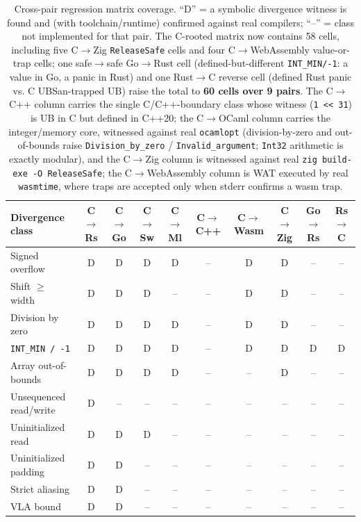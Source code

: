 \documentclass[10pt,a4paper]{article}
\begin{document}
\begin{table}[t]
\centering
\small
\caption{Cross-pair regression matrix coverage. ``D'' = a symbolic divergence
witness is found and (with toolchain/runtime) confirmed against real compilers;
``--'' = class not implemented for that pair. The C-rooted matrix now contains
58 cells, including five C$\to$Zig \texttt{ReleaseSafe} cells and four
C$\to$WebAssembly value-or-trap cells; one safe$\to$safe Go$\to$Rust cell
(defined-but-different \texttt{INT\_MIN/-1}: a value in Go, a panic in Rust) and
one Rust$\to$C reverse cell (defined Rust panic vs. C UBSan-trapped UB) raise the
total to \textbf{60 cells over 9 pairs}. The
C$\to$C++ column carries the single C/C++-boundary class whose witness
(\texttt{1 << 31}) is UB in C but defined in C++20; the C$\to$OCaml column
carries the integer/memory core, witnessed against real \texttt{ocamlopt}
(division-by-zero and out-of-bounds raise \texttt{Division\_by\_zero} /
\texttt{Invalid\_argument}; \texttt{Int32} arithmetic is exactly modular), and
the C$\to$Zig column is witnessed against real \texttt{zig build-exe -O
ReleaseSafe}; the C$\to$WebAssembly column is WAT executed by real
\texttt{wasmtime}, where traps are accepted only when stderr confirms a wasm
trap.}
\label{tab:matrix}
\begin{tabular}{@{}lccccccccc@{}}
\toprule
Divergence class & C$\to$Rs & C$\to$Go & C$\to$Sw & C$\to$Ml & C$\to$C++ & C$\to$Wasm & C$\to$Zig & Go$\to$Rs & Rs$\to$C \\
\midrule
Signed overflow            & D & D & D & D & -- & D & D & -- & -- \\
Shift $\geq$ width          & D & D & D & -- & -- & D & D & -- & -- \\
Division by zero           & D & D & D & D & -- & D & D & -- & -- \\
\texttt{INT\_MIN / -1}     & D & D & D & D & -- & D & D & D & D \\
Array out-of-bounds        & D & D & D & D & -- & -- & D & -- & -- \\
Unsequenced read/write     & D & -- & -- & -- & -- & -- & -- & -- & -- \\
Uninitialized read         & D & D & D & -- & -- & -- & -- & -- & -- \\
Uninitialized padding      & D & D & -- & -- & -- & -- & -- & -- & -- \\
Strict aliasing            & D & D & -- & -- & -- & -- & -- & -- & -- \\
VLA bound                  & D & D & -- & -- & -- & -- & -- & -- & -- \\

\end{tabular}
\end{table}
\end{document}
